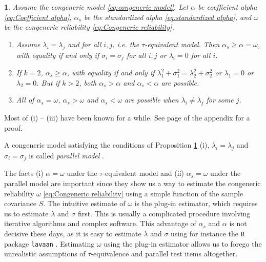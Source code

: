 \documentclass{article}
\makeatletter
\theoremstyle{plain}
\theoremstyle{plain}
\theoremstyle{definition}
\theoremstyle{remark}
\theoremstyle{definition}
\theoremstyle{plain}
\theoremstyle{plain}
\newtheorem{prop}[thm]{\protect\propositionname}
\theoremstyle{definition}
\newenvironment{proof}[1][\protect\proofname]{\par
	\normalfont\topsep6\p@\@plus6\p@\relax
	\trivlist
	\itemindent\parindent
	\item[\hskip\labelsep\scshape #1]\ignorespaces
}{%
	\endtrivlist\@endpefalse
}
\providecommand{\proofname}{Proof}
\providecommand{\propositionname}{Proposition}
\makeatother
\begin{document}
\begin{prop}
\label{prop:Reliabilities.}Assume the congeneric model \eqref{eq:congeneric model}. Let $\alpha$ be coefficient alpha \eqref{eq:Coefficient alpha}, $\alpha_{s}$ be the standardized alpha \eqref{eq:standardized alpha}, and  $\omega$ be the congeneric reliability \eqref{eq:Congeneric reliability}. 
\begin{enumerate}[label=(\roman*)]
\item Assume $\lambda_{i}=\lambda_{j}$ and for all $i,j$, i.e. the $\tau$-equivalent model. Then $\alpha_s \geq \alpha = \omega$, with equality if and only if $\sigma_{i}=\sigma_{j}$ for all $i,j$ or $\lambda_i = 0$ for all $i$.
\item If $k=2$, $\alpha_s\geq\alpha$, with equality if and only if $\lambda_{1}^{2}+\sigma_{1}^{2}=\lambda_{2}^{2}+\sigma_{2}^{2}$ or $\lambda_1 = 0$ or $\lambda_2 = 0$. But if $k>2$, both $\alpha_s>\alpha$
and $\alpha_s<\alpha$ are possible.
\item All of $\alpha_{s}=\omega$, $\alpha_{s}>\omega$ and $\alpha_{s}<\omega$
are possible when $\lambda_{i}\neq\lambda_{j}$ for some $j$.
\end{enumerate}
\end{prop}
\begin{proof}
Most of (i) -- (iii) have been known for a while. See page \pageref{proof:Reliabilities.} of the appendix for a proof.
\end{proof}

A congeneric model satisfying the conditions of Proposition \ref{prop:Reliabilities.} (i), $\lambda_{i}=\lambda_{j}$ and $\sigma_{i}=\sigma_{j}$ is called \emph{parallel model} \citep[][section 2.13]{Lord1968-ax}. 

The facts (i) $\alpha = \omega$ under the $\tau$-equivalent model and (ii) $\alpha_s = \omega$ under the parallel model are important since they show us a way to estimate the congeneric reliability $\omega$ \eqref{eq:Congeneric reliability} using a simple function of the sample covariance $S$. The intuitive estimate of $\omega$ is the plug-in estimator, which requires us to estimate $\lambda$ and $\sigma$ first. This is usually a complicated procedure involving iterative algorithms and complex software. This advantage of $\alpha_s$ and $\alpha$ is not decisive these days, as it is easy to estimate $\lambda$ and $\sigma$ using for instance the \texttt{R} \citep{Team2013-tt} package \texttt{lavaan} \citep{Rosseel2012-yg}. Estimating $\omega$ using the plug-in estimator allows us to forego the unrealistic assumptions of $\tau$-equivalence and parallel test items altogether.
\end{document}

